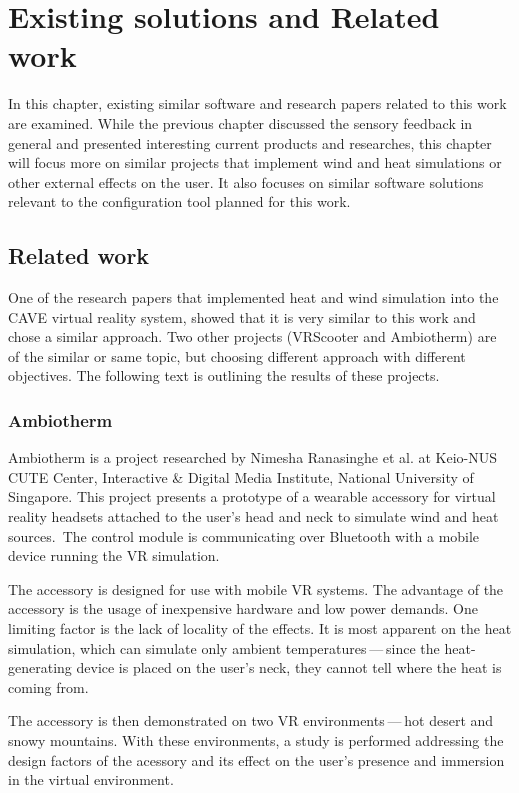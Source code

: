\chapter{Existing solutions and Related work}\label{relatedwork}

In this chapter, existing similar software and research papers related to this
work are examined. While the previous chapter discussed the sensory feedback in
general and presented interesting current products and researches, this
chapter will focus more on similar projects that implement wind and heat simulations
or other external effects on the user. It also focuses on similar software
solutions relevant to the configuration tool planned for this work.


\hypertarget{x-related-work}{\section{Related work}}
One of the research papers that implemented heat and wind simulation into the
CAVE virtual reality system,
showed that it is very similar to this work and chose a similar approach. Two
other projects (VRScooter and Ambiotherm) are of the similar or same topic,
but choosing different approach with different objectives.
The following text is outlining the results of these projects.


\hypertarget{x-ambiotherm}{\subsection{Ambiotherm}}
Ambiotherm is a project researched by Nimesha Ranasinghe et al. at Keio-NUS
CUTE Center, Interactive \& Digital Media Institute, National University of
Singapore. This project presents a prototype of a wearable accessory for virtual
reality headsets attached to the user’s head and neck to simulate wind
and heat sources.\,\cite{ambiotherm} 
The control module is communicating over Bluetooth with
a mobile device running the VR simulation.


The accessory is designed for use with mobile VR systems.
The advantage of the accessory is the usage of inexpensive hardware and low power
demands. One limiting factor is the lack of locality of the effects.
It is most apparent on the heat simulation, which can simulate
only ambient temperatures — since the heat-generating device is
placed on the user’s neck, they cannot tell where the heat is coming from.


The accessory is then demonstrated on two VR environments — hot desert and
snowy mountains. With these environments, a study is performed addressing the
design factors of the acessory and its effect on the user’s presence
and immersion in the virtual environment.


